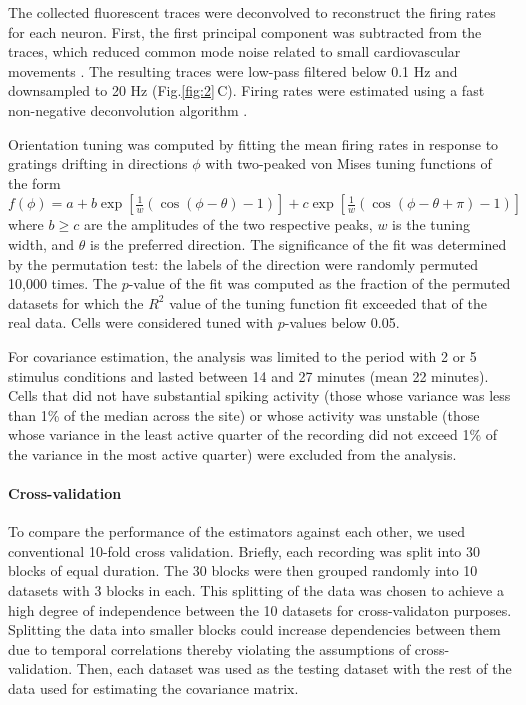 \documentclass[10pt]{article}
\newcommand{\figref}[2]{Fig.\;\ref{fig:#1}\,#2}
\begin{document}
The collected fluorescent traces were deconvolved to reconstruct the firing rates for each neuron. First, the first principal component was subtracted from the traces, which reduced common mode noise related to small cardiovascular movements \cite{Cotton:2013}. The resulting traces were low-pass filtered below 0.1 Hz and downsampled to 20 Hz (\figref{2}{C}). Firing rates were estimated using a fast non-negative deconvolution algorithm \cite{Vogelstein:2010}.

Orientation tuning was computed by fitting the mean firing rates in response to gratings drifting in directions $\phi$ with two-peaked von Mises tuning functions of the form $f(\phi)=a + b\exp\left[\frac 1 w(\cos(\phi-\theta)-1) \right] + c\exp\left[\frac 1 w(\cos(\phi-\theta+\pi)-1) \right]$ where $b\ge c$ are the amplitudes of the two respective peaks, $w$ is the tuning width, and  $\theta$ is the preferred direction. The significance of the fit was determined by the permutation test: the labels of the direction were randomly permuted 10,000 times.  The $p$-value of the fit was computed as the fraction of the permuted datasets for which the $R^2$ value of the tuning function fit exceeded that of the real data.  Cells were considered tuned with $p$-values below 0.05.

For covariance estimation, the analysis was limited to the period with 2 or 5 stimulus conditions and lasted between 14 and 27 minutes (mean 22 minutes).  Cells that did not have substantial spiking activity (those whose variance was less than 1\% of the median across the site) or whose activity was unstable (those whose variance in the least active quarter of the recording did not exceed 1\% of the variance in the most active quarter) were excluded from the analysis.

\paragraph{Cross-validation}
To compare the performance of the estimators against each other, we used conventional 10-fold cross validation. Briefly, each recording was split into 30 blocks of equal duration.  The 30 blocks were then grouped randomly into 10 datasets with 3 blocks in each.  This splitting of the data was chosen to achieve a high degree of independence between the 10 datasets for cross-validaton purposes. Splitting the data into smaller blocks could increase dependencies between them due to temporal correlations thereby violating the assumptions of cross-validation. Then, each dataset was used as the testing dataset with the rest of the data used for estimating the covariance matrix.  
\end{document}
